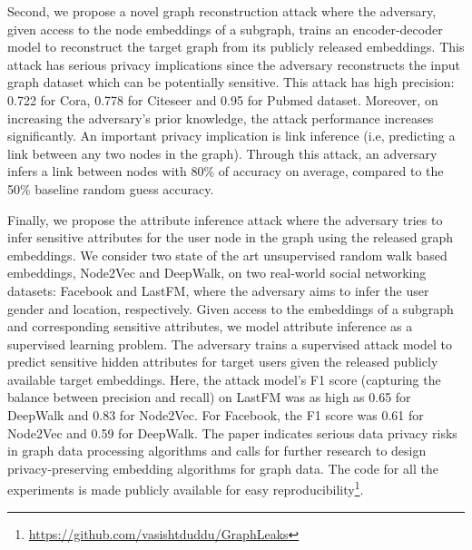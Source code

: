Second, we propose a novel graph reconstruction attack where the adversary, given access to the node embeddings of a subgraph, trains an encoder-decoder model to reconstruct the target graph from its publicly released embeddings.
This attack has serious privacy implications since the adversary reconstructs the input graph dataset which can be potentially sensitive.
This attack has high precision: 0.722 for Cora, 0.778 for Citeseer and 0.95 for Pubmed dataset.
Moreover, on increasing the adversary's prior knowledge, the attack performance increases significantly.
An important privacy implication is link inference (i.e, predicting a link between any two nodes in the graph).
Through this attack, an adversary infers a link between nodes with 80\% of accuracy on average, compared to the 50\% baseline random guess accuracy.


Finally, we propose the attribute inference attack where the adversary tries to infer sensitive attributes for the user node in the graph using the released graph embeddings.
We consider two state of the art unsupervised random walk based embeddings, Node2Vec and DeepWalk, on two real-world social networking datasets: Facebook and LastFM, where the adversary aims to infer the user gender and location, respectively.
Given access to the embeddings of a subgraph and corresponding sensitive attributes, we model attribute inference as a supervised learning problem.
The adversary trains a supervised attack model to predict sensitive hidden attributes for target users given the released publicly available target embeddings.
Here, the attack model's F1 score (capturing the balance between precision and recall) on LastFM was as high as 0.65 for DeepWalk and 0.83 for Node2Vec.
For Facebook, the F1 score was 0.61 for Node2Vec and 0.59 for DeepWalk.
The paper indicates serious data privacy risks in graph data processing algorithms and calls for further research to design privacy-preserving embedding algorithms for graph data.
%
The code for all the experiments is made publicly available for easy reproducibility\footnote{\url{https://github.com/vasishtduddu/GraphLeaks}}.


